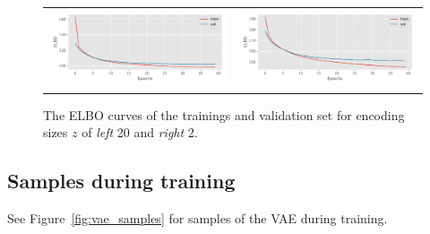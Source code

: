\documentclass{article}
\begin{document}
\begin{figure}[]
  \centering
  \begin{tabularx}{\linewidth}{XX}
    \includegraphics[width=\linewidth]{assignment_3/code/figures/vae_20.pdf} &
    \includegraphics[width=\linewidth]{assignment_3/code/figures/vae_2.pdf}
  \end{tabularx}
  \caption{The ELBO curves of the trainings and validation set for encoding sizes \(z\) of \textit{left} 20 and \textit{right} 2.}
  \label{fig:elbo}
\end{figure}

\subsection{Samples during training}
See Figure~\ref{fig:vae_samples} for samples of the VAE during training.
\end{document}
